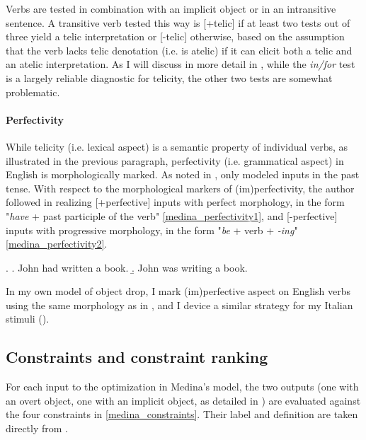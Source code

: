 Verbs are tested in combination with an implicit object or in an intransitive sentence. A transitive verb tested this way is [+telic] if at least two tests out of three yield a telic interpretation or [-telic] otherwise, based on the assumption that the verb lacks telic denotation (i.e. is atelic) if it can elicit both a telic and an atelic interpretation. As I will discuss in more detail in , while the \textit{in/for} test is a largely reliable diagnostic for telicity, the other two tests are somewhat problematic.


\paragraph{Perfectivity} While telicity (i.e. lexical aspect) is a semantic property of individual verbs, as illustrated in the previous paragraph, perfectivity (i.e. grammatical aspect) in English is morphologically marked. As noted in , \textcite{Medina2007} only modeled inputs in the past tense. With respect to the morphological markers of (im)perfectivity, the author followed \textcite{Olsen1997telicity-privative} in realizing [+perfective] inputs with perfect morphology, in the form "\textit{have} + past participle of the verb" \ref{medina_perfectivity1}, and [-perfective] inputs with progressive morphology, in the form "\textit{be} + verb + \textit{-ing}" \ref{medina_perfectivity2}.

\ex. \label{medina_perfectivity} \a. \label{medina_perfectivity1} John had written a book.
\b. \label{medina_perfectivity2}  John was writing a book.

In my own model of object drop, I mark (im)perfective aspect on English verbs using the same morphology as in \textcite{Medina2007}, and I device a similar strategy for my Italian stimuli ().


\subsection{Constraints and constraint ranking} 

For each input to the optimization in Medina's model, the two outputs (one with an overt object, one with an implicit object, as detailed in ) are evaluated against the four constraints in \ref{medina_constraints}. Their label and definition are taken directly from \textcite[72]{Medina2007}.


